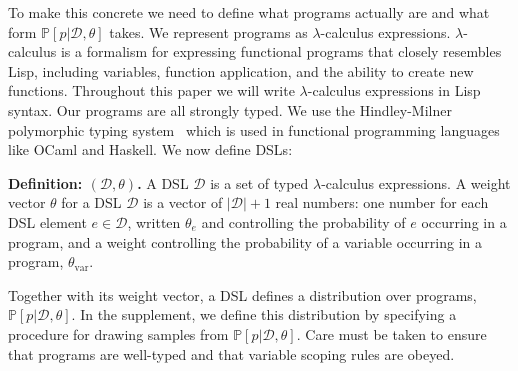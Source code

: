 \documentclass{article}
\newcommand{\code}[1]{{\footnotesize\texttt{#1}}}
\newcommand{\probability}{\mathds{P}} %
\begin{document}
To make this concrete we need to define what programs actually are and
what form $\probability[p |\mathcal{D},\theta]$ takes.
We represent programs as $\lambda$-calculus expressions.
$\lambda$-calculus is a formalism for expressing functional programs
that closely resembles Lisp,
including variables, function application, and the ability to create new functions.
Throughout this paper we will write $\lambda$-calculus expressions in Lisp syntax.
Our programs are all strongly typed.
We use the Hindley-Milner polymorphic typing system~\cite{pierce} which is
used in functional programming languages like OCaml and Haskell.
We now define DSLs:

\noindent\textbf{Definition: $(\mathcal{D},\theta)$.}
A DSL $\mathcal{D}$ is a set of typed $\lambda$-calculus expressions.
A weight vector $\theta$ for a DSL $\mathcal{D}$ is a vector of $|\mathcal{D}| + 1$ real numbers:
one number for each DSL element $e\in \mathcal{D}$, written $\theta_e$ and controlling the probability of  $e$ occurring in a program,
and a weight controlling the probability of a variable occurring in a program, $\theta_{\text{var}}$.

Together with its weight vector,
a DSL defines a distribution over programs, $\probability[p|\mathcal{D},\theta]$.
In the supplement, we define this distribution  
by specifying a procedure for drawing samples from $\probability[p|\mathcal{D},\theta]$.
Care must be taken to ensure that programs are well-typed
 and that variable scoping rules are obeyed.
\end{document}
